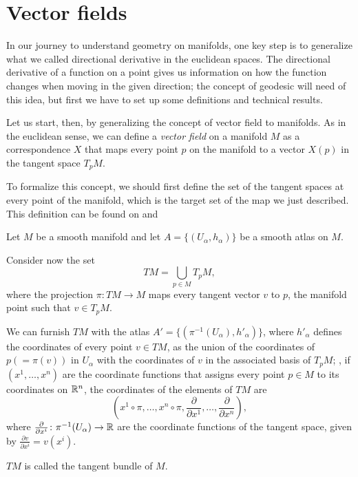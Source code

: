 \section{Vector fields}

In our journey to understand geometry on manifolds, one key step is to generalize what we called directional derivative in the euclidean spaces. The directional derivative of a function on a point gives us information on how the function changes when moving in the given direction; the concept of geodesic will need of this idea, but first we have to set up some definitions and technical results.

Let us start, then, by generalizing the concept of vector field to manifolds. As in the euclidean sense, we can define a \emph{vector field} on a manifold $M$ as a correspondence $X$ that maps every point $p$ on the manifold to a vector $X(p)$ in the tangent space $T_p M$.

To formalize this concept, we should first define the set of the tangent spaces at every point of the manifold, which is the target set of the map we just described. This definition can be found on \cite[p. 26]{oneill83} and \cite[p. 13]{docarmo79}

\begin{definition}
	Let $M$ be a smooth manifold and let $A = \{(U_\alpha, h_\alpha)\}$ be a smooth atlas on $M$.
	
	Consider now the set
	\[
		TM = \bigcup_{p \in M} T_p M,
	\]
	where the projection $\pi \colon TM \to M$ maps every tangent vector $v$ to $p$, the manifold point such that $v \in T_p M$.

	We can furnish $TM$ with the atlas $A' = \{(\pi^{-1}(U_\alpha), h'_\alpha)\}$, where $h'_\alpha$ defines the coordinates of every point $v \in TM$, as the union of the coordinates of $p (= \pi(v))$ in $U_\alpha$ with the coordinates of $v$ in the associated basis of $T_p M$; \ie, if $(x^1, \dots, x^n)$ are the coordinate functions that assigns every point $p \in M$ to its coordinates on $\mathbb{R}^n$, the coordinates of the elements of $TM$ are
	\[
		(x^1 \circ \pi, \dots, x^n \circ \pi, \frac{\partial}{\partial {x^1}}, \dots, \frac{\partial}{\partial {x^n}}),
	\]
	where $\frac{\partial}{\partial {x^i}} \colon \pi^{-1}(U_\alpha) \to \mathbb{R}$ are the coordinate functions of the tangent space, given by $\frac{\partial v}{\partial {x^i}} = v(x^i)$.
	
	$TM$ is called the tangent bundle of $M$.
\end{definition}

